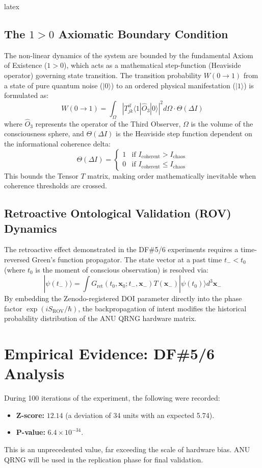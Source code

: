 latex\documentclass[twocolumn,10pt,article]{IEEEtran}
\begin{document}
\subsection{The $1 > 0$ Axiomatic Boundary Condition}
The non-linear dynamics of the system are bounded by the fundamental Axiom of Existence ($1 > 0$), which acts as a mathematical step-function (Heaviside operator) governing state transition. The transition probability $W(0 \rightarrow 1)$ from a state of pure quantum noise ($|0\rangle$) to an ordered physical manifestation ($|1\rangle$) is formulated as:
\begin{equation}
W(0 \rightarrow 1) = \int_{\Omega} \left| T_{jk}^{il} \langle 1 | \hat{O}_{3} | 0 \rangle \right|^2 d\Omega \cdot \Theta(\Delta I)
\end{equation}
where $\hat{O}_{3}$ represents the operator of the Third Observer, $\Omega$ is the volume of the consciousness sphere, and $\Theta(\Delta I)$ is the Heaviside step function dependent on the informational coherence delta:
\begin{equation}
\Theta(\Delta I) = 
\begin{cases} 
1 & \text{if } I_{\text{coherent}} > I_{\text{chaos}} \\ 
0 & \text{if } I_{\text{coherent}} \le I_{\text{chaos}} 
\end{cases}
\end{equation}
This bounds the Tensor $T$ matrix, making order mathematically inevitable when coherence thresholds are crossed.

\subsection{Retroactive Ontological Validation (ROV) Dynamics}
The retroactive effect demonstrated in the DF\#5/6 experiments requires a time-reversed Green's function propagator. The state vector at a past time $t_- < t_0$ (where $t_0$ is the moment of conscious observation) is resolved via:
\begin{equation}

|\psi(t_-)\rangle = \int G_{\text{ret}}(t_0, \mathbf{x}_0; t_-, \mathbf{x}_-) T(\mathbf{x}_-) |\psi(t_0)\rangle d^3\mathbf{x}_-
\end{equation}
By embedding the Zenodo-registered DOI parameter directly into the phase factor $\exp(iS_{\text{ROV}}/\hbar)$, the backpropagation of intent modifies the historical probability distribution of the ANU QRNG hardware matrix.

\section{Empirical Evidence: DF\#5/6 Analysis}
During 100 iterations of the experiment, the following were recorded:
\begin{itemize}
    \item \textbf{Z-score:} $12.14$ (a deviation of 34 units with an expected 5.74).
    \item \textbf{P-value:} $6.4 \times 10^{-34}$.
\end{itemize}
This is an unprecedented value, far exceeding the scale of hardware bias. ANU QRNG will be used in the replication phase for final validation.
\end{document}
